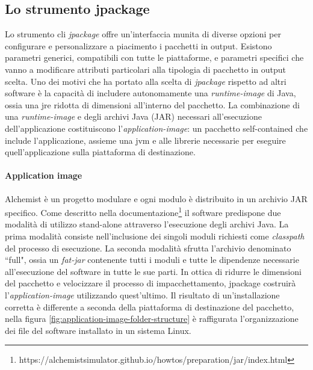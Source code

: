 \subsection{Lo strumento jpackage}\label{sec:design-jpackage}
Lo strumento \ac{cli} \textit{jpackage} offre un'interfaccia munita di diverse opzioni per configurare e personalizzare a piacimento i pacchetti in output. Esistono parametri generici, compatibili con tutte le piattaforme, e parametri specifici che vanno a modificare attributi particolari alla tipologia di pacchetto in output scelta. Uno dei motivi che ha portato alla scelta di \textit{jpackage} rispetto ad altri software è la capacità di includere autonomamente una \textit{runtime-image} di Java, ossia una \ac{jre} ridotta di dimensioni all'interno del pacchetto. La combinazione di una \textit{runtime-image} e degli archivi Java (JAR) necessari all'esecuzione dell'applicazione costituiscono l'\textit{application-image}: un pacchetto self-contained che include l'applicazione, assieme una \ac{jvm} e alle librerie necessarie per eseguire quell'applicazione sulla piattaforma di destinazione.

\paragraph{Application image} Alchemist è un progetto modulare e ogni modulo è distribuito in un archivio JAR specifico. Come descritto nella documentazione\footnote{https://alchemistsimulator.github.io/howtos/preparation/jar/index.html} il software predispone due modalità di utilizzo stand-alone attraverso l'esecuzione degli archivi Java. La prima modalità consiste nell'inclusione dei singoli moduli richiesti come \textit{classpath} del processo di esecuzione. La seconda modalità sfrutta l'archivio denominato ``full", ossia un \textit{fat-jar} contenente tutti i moduli e tutte le dipendenze necessarie all'esecuzione del software in tutte le sue parti. In ottica di ridurre le dimensioni del pacchetto e velocizzare il processo di impacchettamento, jpackage costruirà l'\textit{application-image} utilizzando quest'ultimo. Il risultato di un'installazione corretta è differente a seconda della piattaforma di destinazione del pacchetto, nella figura \ref{fig:application-image-folder-structure} è raffigurata l'organizzazione dei file del software installato in un sistema Linux.  

